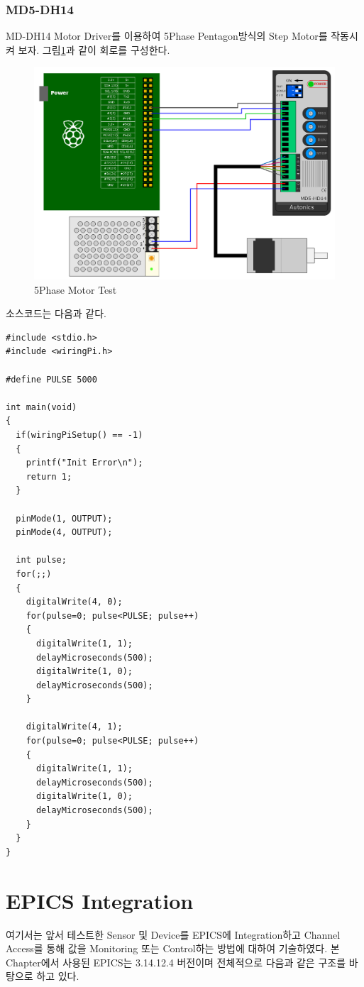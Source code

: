 \documentclass[11pt
  , a4paper
  , article
  , oneside
]{memoir}
\begin{document}
\subsection{MD5-DH14}
MD-DH14 Motor Driver를 이용하여 5Phase Pentagon방식의 Step Motor를 작동시켜 보자.
그림\ref{fig:5phase_test}과 같이 회로를 구성한다.
\begin{figure}[!htb]
\centering
\includegraphics[width=1\textwidth]{./images/raspberry/md5dh14Test.png}
\caption{5Phase Motor Test}
\label{fig:5phase_test}
\end{figure}
소스코드는 다음과 같다.
\begin{lstlisting}[style=termstylenumber, caption={md5dh14.c}, label={list:md5dh14TestCode}]
#include <stdio.h>
#include <wiringPi.h>

#define PULSE 5000

int main(void)
{
  if(wiringPiSetup() == -1)
  {
    printf("Init Error\n");
    return 1;
  }

  pinMode(1, OUTPUT);
  pinMode(4, OUTPUT);

  int pulse;
  for(;;)
  {
    digitalWrite(4, 0);
    for(pulse=0; pulse<PULSE; pulse++)
    {
      digitalWrite(1, 1);
      delayMicroseconds(500);
      digitalWrite(1, 0);
      delayMicroseconds(500);
    }

    digitalWrite(4, 1);
    for(pulse=0; pulse<PULSE; pulse++)
    {
      digitalWrite(1, 1);
      delayMicroseconds(500);
      digitalWrite(1, 0);
      delayMicroseconds(500);
    }
  }
}

\end{lstlisting}
\chapter{EPICS Integration}
여기서는 앞서 테스트한 Sensor 및 Device를 EPICS에 Integration하고 Channel Access를 통해 값을 Monitoring
또는 Control하는 방법에 대하여 기술하였다. 본 Chapter에서 사용된 EPICS는 3.14.12.4 버전이며 전체적으로
다음과 같은 구조를 바탕으로 하고 있다.
\end{document}
